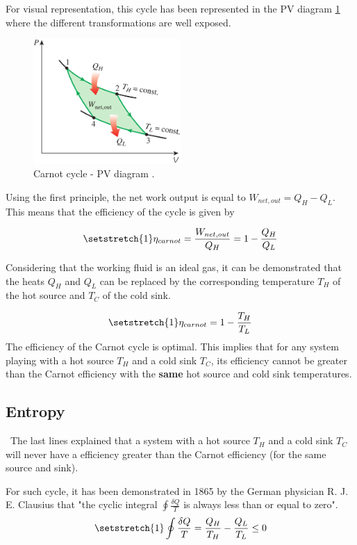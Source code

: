 For visual representation, this cycle has been represented in the PV diagram \ref{fig:C2_5_CarnotPV} where the different transformations are well exposed.
\begin{figure}[h]
\centering
\includegraphics[width=0.5\textwidth]{Carnot_PV.png}
\caption{Carnot cycle - PV diagram \cite{2015}.}
\label{fig:C2_5_CarnotPV}
\end{figure}

Using the first principle, the net work output is equal to $W_{net,out}=Q_H-Q_L$. This means that the efficiency of the cycle is given by

\begin{equation}
\setstretch{1}
\eta_{carnot} = \frac{W_{net,out}}{Q_H} = 1 - \frac{Q_H}{Q_L}
\end{equation} 

Considering that the working fluid is an ideal gas, it can be demonstrated that the heats $Q_H$ and $Q_L$ can be replaced by the corresponding temperature $T_H$ of the hot source and $T_C$ of the cold sink.

\begin{equation}
\setstretch{1}
\eta_{carnot}=1-\frac{T_H}{T_L}\label{eq:C2_5_eff_carnot}
\end{equation} 
The efficiency of the Carnot cycle is optimal. This implies that for any system playing with a hot source $T_H$ and a cold sink $T_C$, its efficiency cannot be greater than the Carnot efficiency with the \textbf{same} hot source and cold sink temperatures.

\subsection{Entropy}
\quad\ The last lines explained that a system with a hot source $T_H$ and a cold sink $T_C$ will never have a efficiency greater than the Carnot efficiency (for the same source and sink).

For such cycle, it has been demonstrated in 1865 by the German physician R. J. E. Clausius that "the cyclic integral $\oint\frac{\delta Q}{T}$ is always less than or equal to zero"\cite{2015}.
\begin{equation}
\setstretch{1}
\oint\frac{\delta Q}{T} = \frac{Q_H}{T_H} - \frac{Q_L}{T_L}\leq 0\label{eq:C2_5_cyc}
\end{equation}


